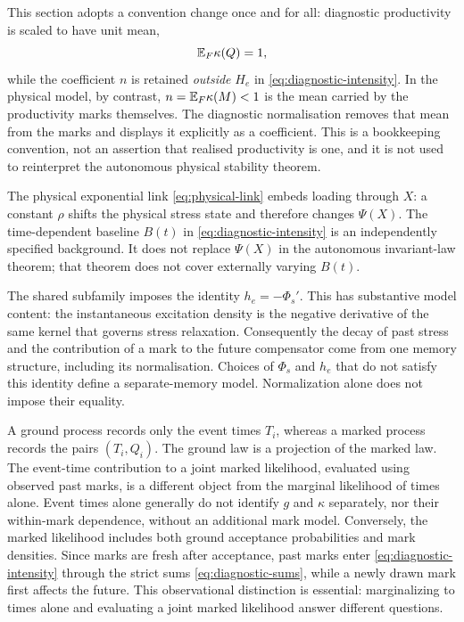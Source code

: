 This section adopts a convention change once and for all: diagnostic productivity is scaled to have unit mean,
\[
\mathbb{E} _F\kappa(Q)=1,
\]
while the coefficient \(n\) is retained \emph{outside} \(H_e\) in \eqref{eq:diagnostic-intensity}. In the physical model, by contrast, \(n=\mathbb{E} _F\kappa(M)<1\) is the mean carried by the productivity marks themselves. The diagnostic normalisation removes that mean from the marks and displays it explicitly as a coefficient. This is a bookkeeping convention, not an assertion that realised productivity is one, and it is not used to reinterpret the autonomous physical stability theorem.

The physical exponential link \eqref{eq:physical-link} embeds loading through \(X\): a constant \(\rho\) shifts the physical stress state and therefore changes \(\Psi(X)\). The time-dependent baseline \(B(t)\) in \eqref{eq:diagnostic-intensity} is an independently specified background. It does not replace \(\Psi(X)\) in the autonomous invariant-law theorem; that theorem does not cover externally varying \(B(t)\).

The shared subfamily imposes the identity \(h_e=-\Phi_s'\). This has substantive model content: the instantaneous excitation density is the negative derivative of the same kernel that governs stress relaxation. Consequently the decay of past stress and the contribution of a mark to the future compensator come from one memory structure, including its normalisation. Choices of \(\Phi_s\) and \(h_e\) that do not satisfy this identity define a separate-memory model. Normalization alone does not impose their equality.

A ground process records only the event times \(T_i\), whereas a marked process records the pairs \((T_i,Q_i)\). The ground law is a projection of the marked law. The event-time contribution to a joint marked likelihood, evaluated using observed past marks, is a different object from the marginal likelihood of times alone. Event times alone generally do not identify \(g\) and \(\kappa\) separately, nor their within-mark dependence, without an additional mark model. Conversely, the marked likelihood includes both ground acceptance probabilities and mark densities. Since marks are fresh after acceptance, past marks enter \eqref{eq:diagnostic-intensity} through the strict sums \eqref{eq:diagnostic-sums}, while a newly drawn mark first affects the future. This observational distinction is essential: marginalizing to times alone and evaluating a joint marked likelihood answer different questions.



